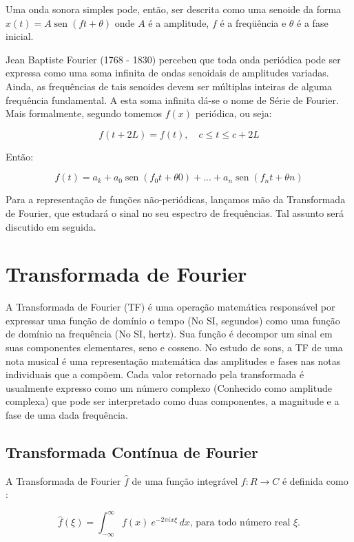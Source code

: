 \documentclass[brazil,times]{abnt}
\begin{document}
	Uma onda sonora simples pode, então, ser descrita como uma senoide da forma $x(t) = A \operatorname{sen} (ft + \theta)$ onde $A$ é a amplitude, $f$ é a freqüência e $\theta$ é a fase inicial.

	Jean Baptiste Fourier (1768 - 1830) percebeu que toda onda periódica pode ser expressa como uma soma infinita de ondas senoidais de amplitudes variadas. Ainda, as frequências de tais senoides devem ser múltiplas inteiras de alguma frequência fundamental. A esta soma infinita dá-se o nome de Série de Fourier. \cite{burk2005music} Mais formalmente, segundo \cite{wiki:serie-fourier} tomemos $f(x)$ periódica, ou seja:


	$$f(t + 2L) = f(t), \quad c \le t \le c + 2L$$

	Então:

	$$f(t) = a_k + a_0\operatorname{sen}(f_0t + \theta 0) +... + a_n\operatorname{sen} (f_nt + \theta n)$$


	Para a representação de funções não-periódicas, lançamos mão da Transformada de Fourier, que estudará o sinal no seu espectro de frequências. Tal assunto será discutido em seguida.

\chapter{Transformada de Fourier}
	A Transformada de Fourier (TF) é uma operação matemática responsável por expressar uma função de domínio o tempo (No SI, segundos) como uma função de domínio na frequência (No SI, hertz). Sua função é decompor um sinal em suas componentes elementares, seno e cosseno. \cite{ufcg:transformada-fourier} No estudo de sons, a TF de uma nota musical é uma representação matemática das amplitudes e fases nas notas individuais que a compõem. Cada valor retornado pela transformada é usualmente expresso como um número complexo (Conhecido como amplitude complexa) que pode ser interpretado como duas componentes, a magnitude e a fase de uma dada frequência.


	\section{Transformada Contínua de Fourier}
		A Transformada de Fourier $\hat{f}$ de uma função integrável $f: R \rightarrow C$ é definida como \cite{wiki:fourier-transform}:

		$$\hat{f}(\xi) = \int_{-\infty}^{\infty} f(x)\ e^{- 2\pi i x \xi}\,dx \text{, para todo número real } \xi.$$
\end{document}
